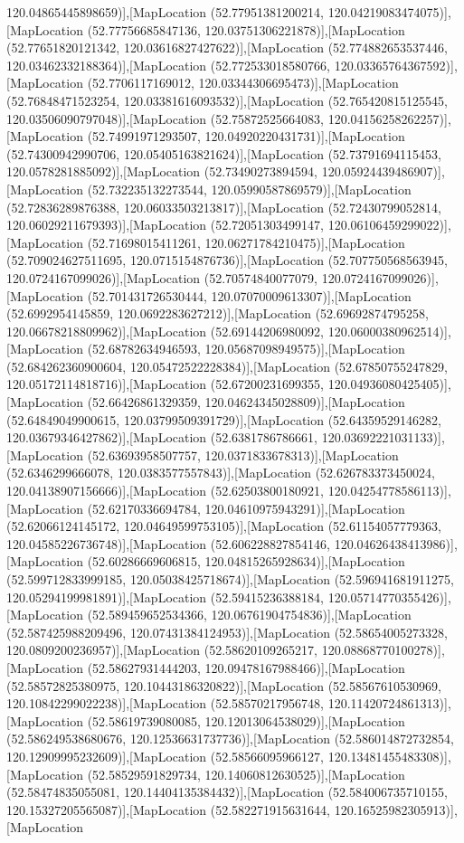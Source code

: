 120.04865445898659)],[MapLocation (52.77951381200214, 120.04219083474075)],[MapLocation (52.77756685847136, 120.03751306221878)],[MapLocation (52.77651820121342, 120.03616827427622)],[MapLocation (52.774882653537446, 120.03462332188364)],[MapLocation (52.772533018580766, 120.03365764367592)],[MapLocation (52.7706117169012, 120.03344306695473)],[MapLocation (52.76848471523254, 120.03381616093532)],[MapLocation (52.765420815125545, 120.03506090797048)],[MapLocation (52.75872525664083, 120.04156258262257)],[MapLocation (52.74991971293507, 120.04920220431731)],[MapLocation (52.74300942990706, 120.05405163821624)],[MapLocation (52.73791694115453, 120.0578281885092)],[MapLocation (52.73490273894594, 120.05924439486907)],[MapLocation (52.732235132273544, 120.05990587869579)],[MapLocation (52.72836289876388, 120.06033503213817)],[MapLocation (52.72430799052814, 120.06029211679393)],[MapLocation (52.72051303499147, 120.06106459299022)],[MapLocation (52.71698015411261, 120.06271784210475)],[MapLocation (52.709024627511695, 120.0715154876736)],[MapLocation (52.707750568563945, 120.0724167099026)],[MapLocation (52.70574840077079, 120.0724167099026)],[MapLocation (52.701431726530444, 120.07070009613307)],[MapLocation (52.6992954145859, 120.0692283627212)],[MapLocation (52.69692874795258, 120.06678218809962)],[MapLocation (52.69144206980092, 120.06000380962514)],[MapLocation (52.68782634946593, 120.05687098949575)],[MapLocation (52.684262360900604, 120.05472522228384)],[MapLocation (52.67850755247829, 120.05172114818716)],[MapLocation (52.67200231699355, 120.04936080425405)],[MapLocation (52.66426861329359, 120.04624345028809)],[MapLocation (52.64849049900615, 120.03799509391729)],[MapLocation (52.64359529146282, 120.03679346427862)],[MapLocation (52.6381786786661, 120.03692221031133)],[MapLocation (52.63693958507757, 120.0371833678313)],[MapLocation (52.6346299666078, 120.0383577557843)],[MapLocation (52.626783373450024, 120.04138907156666)],[MapLocation (52.62503800180921, 120.04254778586113)],[MapLocation (52.62170336694784, 120.04610975943291)],[MapLocation (52.62066124145172, 120.04649599753105)],[MapLocation (52.61154057779363, 120.04585226736748)],[MapLocation (52.606228827854146, 120.04626438413986)],[MapLocation (52.60286669606815, 120.04815265928634)],[MapLocation (52.599712833999185, 120.05038425718674)],[MapLocation (52.596941681911275, 120.05294199981891)],[MapLocation (52.59415236388184, 120.05714770355426)],[MapLocation (52.589459652534366, 120.06761904754836)],[MapLocation (52.587425988209496, 120.07431384124953)],[MapLocation (52.58654005273328, 120.0809200236957)],[MapLocation (52.58620109265217, 120.08868770100278)],[MapLocation (52.58627931444203, 120.09478167988466)],[MapLocation (52.58572825380975, 120.10443186320822)],[MapLocation (52.58567610530969, 120.10842299022238)],[MapLocation (52.58570217956748, 120.11420724861313)],[MapLocation (52.58619739080085, 120.12013064538029)],[MapLocation (52.586249538680676, 120.12536631737736)],[MapLocation (52.586014872732854, 120.12909995232609)],[MapLocation (52.58566095966127, 120.13481455483308)],[MapLocation (52.58529591829734, 120.14060812630525)],[MapLocation (52.58474835055081, 120.14404135384432)],[MapLocation (52.584006735710155, 120.15327205565087)],[MapLocation (52.582271915631644, 120.16525982305913)],[MapLocation 